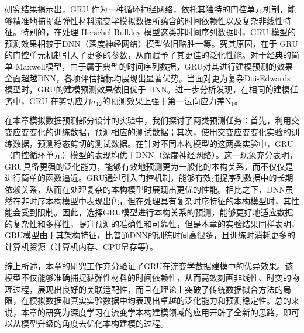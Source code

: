 研究结果揭示出，GRU 作为一种循环神经网络，依托其独特的门控单元机制，能够精准地捕捉黏弹性材料流变学模拟数据所蕴含的时间依赖性以及复杂非线性特征。特别的，在处理 Herschel-Bulkley 模型这类非时间序列数据时，GRU 模型的预测效果相较于DNN（深度神经网络）模型依旧略胜一筹。究其原因，在于 GRU 的门控单元机制引入了更多的参数，从而赋予了其更佳的泛化性能。对于经典的简单 Maxwell模型，由于属于典型的时间序列数据，GRU对其进行建模预测的效果全面超越DNN，各项评估指标均展现出显著优势。当面对更为复杂Doi-Edwards 模型时，GRU的建模预测效果依旧优于 DNN。进一步分析发现，在相同的建模任务中，GRU 在剪切应力$\sigma_{12}$的预测效果上强于第一法向应力差N$_1$。

在本章模拟数据预测部分设计的实验中，我们探讨了两类预测任务：首先，利用交变应变变化的训练数据，预测相应的测试数据；其次，使用交变应变变化实验的训练数据，预测稳态剪切的测试数据。在针对不同本构模型的这两类实验中，GRU（门控循环单元）模型的表现均优于DNN（深度神经网络）。这一现象充分表明，GRU具备更强的泛化能力，能够有效地预测更为一般化的本构关系，而不仅仅是进行简单的函数逼近。GRU通过引入门控机制，能够有效捕捉序列数据中的长期依赖关系，从而在处理复杂的本构模型时展现出更优的性能。相比之下，DNN虽然在非时序本构模型中表现出色，但在处理具有复杂时序特征的本构模型时，其性能会受到限制。因此，选择GRU模型进行本构关系的预测，能够更好地适应数据的复杂性和多样性，提升预测的准确性和可靠性，但是本章的实验结果同样表明，GRU模型由于其架构特征，比普通DNN的训练时间高很多，且训练时消耗更多的计算机资源（计算机内存、GPU显存等）。

综上所述，本章的研究工作充分验证了GRU在流变学数据建模中的优异效果。该模型不仅能够准确捕捉黏弹性材料的时间依赖性，从而高效刻画非线性、时变的物理过程，展现出良好的关联适配性，而且在理论上突破了传统数据拟合方法的局限，在模拟数据和真实实验数据中均表现出卓越的泛化能力和预测稳定性。总的来说，本章的研究为深度学习在流变学本构建模领域的应用开辟了全新的思路，即可以从模型升级的角度去优化本构建模的过程。





